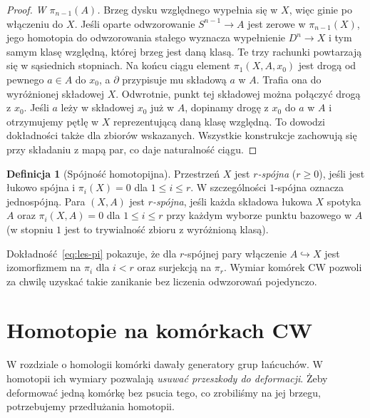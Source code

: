 \documentclass[11pt,a4paper,oneside]{report}
\theoremstyle{plain}
\theoremstyle{definition}
\newtheorem{definicja}[twierdzenie]{Definicja}
\theoremstyle{remark}
\begin{document}
\begin{proof}
\emph{W $\pi_{n-1}(A)$.} Brzeg
dysku względnego wypełnia
się w $X$, więc ginie
po włączeniu do $X$.
Jeśli oparte odwzorowanie
$S^{n-1}\to A$ jest
zerowe w $\pi_{n-1}(X)$,
jego homotopia do odwzorowania
stałego wyznacza wypełnienie
$D^n\to X$ i tym samym
klasę względną, której
brzeg jest daną klasą.
Te trzy rachunki powtarzają się w sąsiednich stopniach.
Na końcu ciągu element $\pi_1(X,A,x_0)$ jest drogą
od pewnego $a\in A$ do $x_0$, a $\partial$ przypisuje mu
składową $a$ w $A$. Trafia ona do wyróżnionej składowej $X$.
Odwrotnie, punkt tej składowej można połączyć drogą z $x_0$.
Jeśli $a$ leży w składowej $x_0$ już w $A$, dopinamy drogę
z $x_0$ do $a$ w $A$ i otrzymujemy pętlę w $X$ reprezentującą
daną klasę względną. To dowodzi dokładności także dla zbiorów wskazanych.
Wszystkie konstrukcje zachowują się przy składaniu z mapą par,
co daje naturalność ciągu.
\end{proof}

\begin{definicja}[Spójność homotopijna]
\label{def:spojnosc-homotopijna}
Przestrzeń $X$ jest
\emph{$r$-spójna} ($r\geq0$),
jeśli jest łukowo spójna
i $\pi_i(X)=0$ dla $1\leq i\leq r$.
W szczególności $1$-spójna
oznacza jednospójną.
Para $(X,A)$ jest
\emph{$r$-spójna}, jeśli
każda składowa łukowa $X$
spotyka $A$ oraz
$\pi_i(X,A)=0$ dla
$1\leq i\leq r$ przy każdym wyborze punktu bazowego w $A$
(w stopniu $1$ jest to
trywialność zbioru
z wyróżnioną klasą).
\end{definicja}

Dokładność~\eqref{eq:les-pi}
pokazuje, że dla $r$-spójnej
pary włączenie $A\hookrightarrow X$
jest izomorfizmem na
$\pi_i$ dla $i<r$ oraz
surjekcją na $\pi_r$.
Wymiar komórek CW pozwoli
za chwilę uzyskać takie
zanikanie bez liczenia odwzorowań
pojedynczo.

\section{Homotopie na komórkach CW}
\label{sec:pi-n-cw}

W rozdziale o homologii komórki dawały
generatory grup łańcuchów. W homotopii
ich wymiary pozwalają \emph{usuwać
przeszkody do deformacji}. Żeby
deformować jedną komórkę bez psucia
tego, co zrobiliśmy na jej brzegu,
potrzebujemy przedłużania homotopii.
\end{document}
